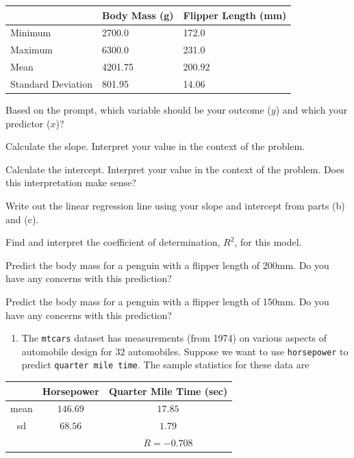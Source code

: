 \documentclass[
]{book}
\providecommand{\tightlist}{%
  \setlength{\itemsep}{0pt}\setlength{\parskip}{0pt}}
\begin{document}
\begin{longtable}[]{@{}lll@{}}
\toprule\noalign{}
& Body Mass (g) & Flipper Length (mm) \\
\midrule\noalign{}
\endhead
\bottomrule\noalign{}
\endlastfoot
Minimum & 2700.0 & 172.0 \\
Maximum & 6300.0 & 231.0 \\
Mean & 4201.75 & 200.92 \\
Standard Deviation & 801.95 & 14.06 \\
\end{longtable}

Based on the prompt, which variable should be your outcome (\(y\)) and
which your predictor (\(x\))?

Calculate the slope. Interpret your value in the context of the
problem.

Calculate the intercept. Interpret your value in the context of the
problem. Does this interpretation make sense?

Write out the linear regression line using your slope and intercept
from parts (b) and (c).

Find and interpret the coefficient of determination, \(R^2\), for this
model.

Predict the body mass for a penguin with a flipper length of 200mm.
Do you have any concerns with this prediction?

Predict the body mass for a penguin with a flipper length of 150mm.
Do you have any concerns with this prediction?

\begin{enumerate}
\def\labelenumi{\arabic{enumi}.}
\setcounter{enumi}{2}
\tightlist
\item
  The \texttt{mtcars} dataset has measurements (from 1974) on various aspects
  of automobile design for 32 automobiles. Suppose we want to use
  \texttt{horsepower} to predict \texttt{quarter\ mile\ time}. The sample statistics
  for these data are
\end{enumerate}

\begin{longtable}[]{@{}ccc@{}}
\toprule\noalign{}
& Horsepower & Quarter Mile Time (sec) \\
\midrule\noalign{}
\endhead
\bottomrule\noalign{}
\endlastfoot
mean & \(146.69\) & \(17.85\) \\
sd & \(68.56\) & \(1.79\) \\
& & \(R = -0.708\) \\
\end{longtable}
\end{document}
